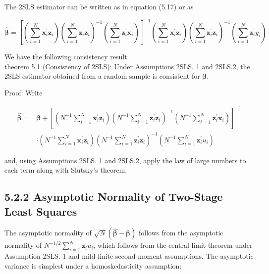 \documentclass[10pt]{article}
\begin{document}
The 2SLS estimator can be written as in equation (5.17) or as


\begin{equation*}
\hat{\boldsymbol{\beta}}=\left[\left(\sum_{i=1}^{N} \mathbf{x}_{i}^{\prime} \mathbf{z}_{i}\right)\left(\sum_{i=1}^{N} \mathbf{z}_{i}^{\prime} \mathbf{z}_{i}\right)^{-1}\left(\sum_{i=1}^{N} \mathbf{z}_{i}^{\prime} \mathbf{x}_{i}\right)\right]^{-1}\left(\sum_{i=1}^{N} \mathbf{x}_{i}^{\prime} \mathbf{z}_{i}\right)\left(\sum_{i=1}^{N} \mathbf{z}_{i}^{\prime} \mathbf{z}_{i}\right)^{-1}\left(\sum_{i=1}^{N} \mathbf{z}_{i}^{\prime} y_{i}\right) \tag{5.22}
\end{equation*}


We have the following consistency result.\\
theorem 5.1 (Consistency of 2SLS): Under Assumptions 2SLS. 1 and 2SLS.2, the 2SLS estimator obtained from a random sample is consistent for $\boldsymbol{\beta}$.

Proof: Write

$$
\begin{aligned}
\hat{\boldsymbol{\beta}}= & \boldsymbol{\beta}+\left[\left(N^{-1} \sum_{i=1}^{N} \mathbf{x}_{i}^{\prime} \mathbf{z}_{i}\right)\left(N^{-1} \sum_{i=1}^{N} \mathbf{z}_{i}^{\prime} \mathbf{z}_{i}\right)^{-1}\left(N^{-1} \sum_{i=1}^{N} \mathbf{z}_{i}^{\prime} \mathbf{x}_{i}\right)\right]^{-1} \\
& \cdot\left(N^{-1} \sum_{i=1}^{N} \mathbf{x}_{i}^{\prime} \mathbf{z}_{i}\right)\left(N^{-1} \sum_{i=1}^{N} \mathbf{z}_{i}^{\prime} \mathbf{z}_{i}\right)^{-1}\left(N^{-1} \sum_{i=1}^{N} \mathbf{z}_{i}^{\prime} u_{i}\right)
\end{aligned}
$$

and, using Assumptions 2SLS. 1 and 2SLS.2, apply the law of large numbers to each term along with Slutsky's theorem.

\subsection*{5.2.2 Asymptotic Normality of Two-Stage Least Squares}
The asymptotic normality of $\sqrt{N}(\hat{\boldsymbol{\beta}}-\boldsymbol{\beta})$ follows from the asymptotic normality of $N^{-1 / 2} \sum_{i=1}^{N} \mathbf{z}_{i}^{\prime} u_{i}$, which follows from the central limit theorem under Assumption 2SLS. 1 and mild finite second-moment assumptions. The asymptotic variance is simplest under a homoskedasticity assumption:
\end{document}
